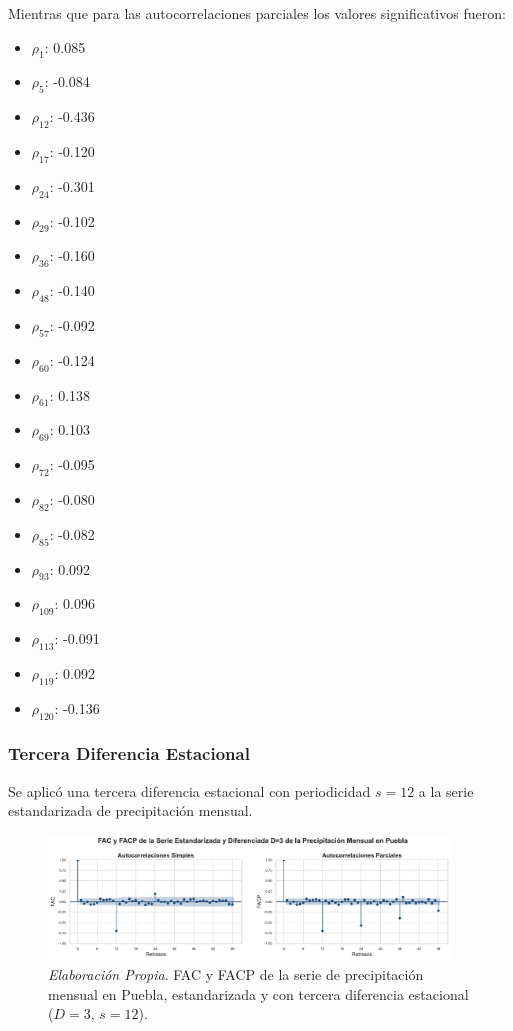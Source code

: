 \documentclass[12pt,letterpaper]{article}   %
\begin{document}
\normalsize Mientras que para las autocorrelaciones parciales los valores significativos fueron: \begin{multicols}{5} \scriptsize \begin{itemize} \item $\rho_1$: 0.085 \item $\rho_5$: -0.084 \item $\rho_{12}$: -0.436 \item $\rho_{17}$: -0.120 \item $\rho_{24}$: -0.301 \item $\rho_{29}$: -0.102 \item $\rho_{36}$: -0.160 \item $\rho_{48}$: -0.140 \item $\rho_{57}$: -0.092 \item $\rho_{60}$: -0.124 \item $\rho_{61}$: 0.138 \item $\rho_{69}$: 0.103 \item $\rho_{72}$: -0.095 \item $\rho_{82}$: -0.080 \item $\rho_{85}$: -0.082 \item $\rho_{93}$: 0.092 \item $\rho_{109}$: 0.096 \item $\rho_{113}$: -0.091 \item $\rho_{119}$: 0.092 \item $\rho_{120}$: -0.136 \end{itemize} \end{multicols}{}



    \subsubsection{Tercera Diferencia Estacional}



Se aplicó una tercera diferencia estacional con periodicidad $s=12$ a la serie estandarizada de precipitación mensual. 

\begin{figure}[h!]
\centering
\includegraphics[width=0.95\textwidth]{imagenes/03-04-fac-facp-serie-D3.pdf}
\caption{\textit{Elaboración Propia}. FAC y FACP de la serie de precipitación mensual en Puebla, estandarizada y con tercera diferencia estacional ($D=3$, $s=12$).}
\end{figure}
\end{document}
